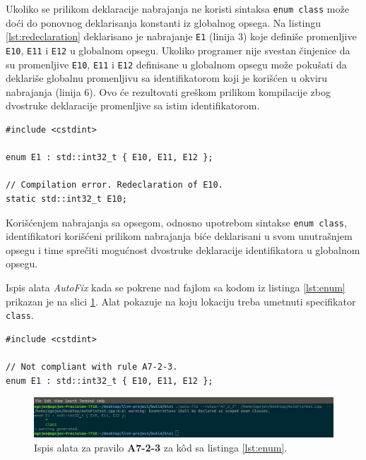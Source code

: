 \documentclass[12pt,oneside]{memoir}
\begin{document}
Ukoliko se prilikom deklaracije nabrajanja ne koristi sintaksa \texttt{enum class} mo\v{z}e do\'{c}i do ponovnog deklarisanja konstanti iz
globalnog opsega. Na listingu \ref{lst:redeclaration} deklarisano je nabrajanje \texttt{E1} (linija 3) koje defini\v{s}e promenljive \texttt{E10}, \texttt{E11}
i \texttt{E12} u globalnom opsegu. Ukoliko programer nije svestan \v{c}injenice da su promenljive \texttt{E10}, \texttt{E11}
i \texttt{E12} definisane u globalnom opsegu mo\v{z}e poku\v{s}ati da deklari\v{s}e globalnu promenljivu sa identifikatorom koji je kori\v{s}\'{c}en u okviru nabrajanja (linija 6). Ovo \'{c}e rezultovati gre\v{s}kom prilikom kompilacije zbog dvostruke deklaracije promenljive sa istim identifikatorom.

\begin{lstlisting}[style=customc, caption={Primer koda u okviru kog dolazi do dvostruke deklaracije promenljive sa istim identifikatorom.}, label=lst:redeclaration]
#include <cstdint>

enum E1 : std::int32_t { E10, E11, E12 };

// Compilation error. Redeclaration of E10.
static std::int32_t E10; 
\end{lstlisting}
Kori\v{s}\'{c}enjem nabrajanja sa opsegom, odnosno upotrebom sintakse \texttt{enum class}, identifikatori kori\v{s}\'{c}eni prilikom
nabrajanja bi\'{c}e deklarisani u svom unutra\v{s}njem opsegu i time spre\v{c}iti mogu\'{c}nost dvostruke deklaracije identifikatora u globalnom opsegu.

Ispis alata \textit{AutoFix} kada se pokrene nad fajlom sa kodom iz listinga \ref{lst:enum} prikazan je na slici \ref{fig:A7-2-3}. 
Alat pokazuje na koju lokaciju treba umetnuti specifikator \texttt{class}.
\\

\begin{lstlisting}[style=customc, caption={Primer koda koji nije napisan u skladu sa pravilom \textbf{A7-2-3}, odnosno ne koristi sintaksu \texttt{enum class}.}, label=lst:enum]
#include <cstdint>

// Not compliant with rule A7-2-3.
enum E1 : std::int32_t { E10, E11, E12 };

\end{lstlisting}


\begin{figure}[!h]
\begin{center}
\includegraphics[scale=0.3]{A7_2_3.png}
\end{center}
\caption{Ispis alata za pravilo \textbf{A7-2-3} za k\^{o}d sa listinga \ref{lst:enum}.}
\label{fig:A7-2-3}
\end{figure}
\end{document}
